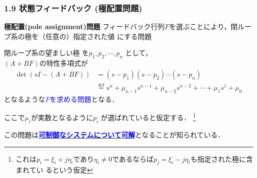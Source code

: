 \documentclass[10pt]{beamer}
\begin{document}
\begin{frame}[t]
\frametitle{1.9 状態フィードバック (極配置問題)}
\begin{block}{\bf 極配置(pole assignment)問題}
フィードバック行列$F$を選ぶことにより，閉ループ系の極を（任意の）指定された値
にする問題
\end{block}

閉ループ系の望ましい極
を$p_1, p_2, \cdots, p_n$ として，\\
$(A + B F)$の特性多項式が
\begin{align}
 \operatorname{det} (s I - (A + B F))
 &= (s - p_1)(s - p_2) \cdots (s - p_n) \nonumber \\
 &\stackrel{\text{def}}{=} s^n + \mu_{n-1} s^{n-1} + \mu_{n-2} s^{n-2}
  + \cdots + \mu_1 s^1 + \mu_0
\end{align}
となるような\textcolor{blue}{$F$を求める問題}となる．

 

ここで$\mu_i$が実数となるように$p_i$
が選ばれていると仮定する．
\footnote{これは$p_i = \xi_i + j \eta_i $であり$\eta_i
\neq 0$であるならば$p_j = \xi_i - j \eta_i$も指定された極に含まれてい
るという仮定}

この問題は\underline{\textcolor{blue}{\bf 可制御なシステムについて可解}}となることが知られている．

\end{frame}
\end{document}
